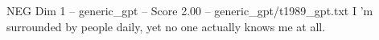 \begin{textsample}{NEG Dim 1 – generic\_gpt – Score 2.00 – generic\_gpt/t1989\_gpt.txt}  \label{ex:f1_neg_034}
I ’m surrounded by people daily, yet no one actually knows me at all.

\end{textsample}
